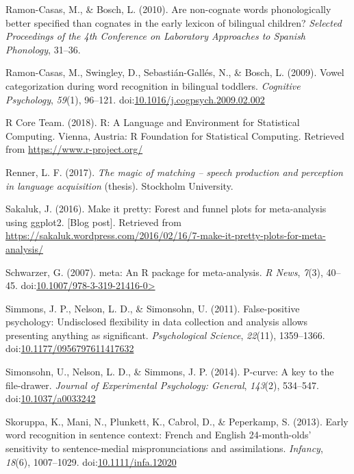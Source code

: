 \documentclass[
  man, noextraspace]{apa6}
\begin{document}
\leavevmode\hypertarget{ref-Ramon-Casas2010}{}%
Ramon-Casas, M., \& Bosch, L. (2010). Are non-cognate words phonologically better specified than cognates in the early lexicon of bilingual children? \emph{Selected Proceedings of the 4th Conference on Laboratory Approaches to Spanish Phonology}, 31--36.

\leavevmode\hypertarget{ref-Ramon-Casas2009}{}%
Ramon-Casas, M., Swingley, D., Sebastián-Gallés, N., \& Bosch, L. (2009). Vowel categorization during word recognition in bilingual toddlers. \emph{Cognitive Psychology}, \emph{59}(1), 96--121. doi:\href{https://doi.org/10.1016/j.cogpsych.2009.02.002}{10.1016/j.cogpsych.2009.02.002}

\leavevmode\hypertarget{ref-R}{}%
R Core Team. (2018). R: A Language and Environment for Statistical Computing. Vienna, Austria: R Foundation for Statistical Computing. Retrieved from \url{https://www.r-project.org/}

\leavevmode\hypertarget{ref-Renner2017}{}%
Renner, L. F. (2017). \emph{The magic of matching -- speech production and perception in language acquisition} (thesis). Stockholm University.

\leavevmode\hypertarget{ref-Sakaluk2016}{}%
Sakaluk, J. (2016). Make it pretty: Forest and funnel plots for meta-analysis using ggplot2. {[}Blog post{]}. Retrieved from \url{https://sakaluk.wordpress.com/2016/02/16/7-make-it-pretty-plots-for-meta-analysis/}

\leavevmode\hypertarget{ref-meta}{}%
Schwarzer, G. (2007). meta: An R package for meta-analysis. \emph{R News}, \emph{7}(3), 40--45. doi:\href{https://doi.org/10.1007/978-3-319-21416-0\%3E}{10.1007/978-3-319-21416-0\textgreater{}}

\leavevmode\hypertarget{ref-Simmons2011}{}%
Simmons, J. P., Nelson, L. D., \& Simonsohn, U. (2011). False-positive psychology: Undisclosed flexibility in data collection and analysis allows presenting anything as significant. \emph{Psychological Science}, \emph{22}(11), 1359--1366. doi:\href{https://doi.org/10.1177/0956797611417632}{10.1177/0956797611417632}

\leavevmode\hypertarget{ref-pcurve}{}%
Simonsohn, U., Nelson, L. D., \& Simmons, J. P. (2014). P-curve: A key to the file-drawer. \emph{Journal of Experimental Psychology: General}, \emph{143}(2), 534--547. doi:\href{https://doi.org/10.1037/a0033242}{10.1037/a0033242}

\leavevmode\hypertarget{ref-Skoruppa2013}{}%
Skoruppa, K., Mani, N., Plunkett, K., Cabrol, D., \& Peperkamp, S. (2013). Early word recognition in sentence context: French and English 24-month-olds' sensitivity to sentence-medial mispronunciations and assimilations. \emph{Infancy}, \emph{18}(6), 1007--1029. doi:\href{https://doi.org/10.1111/infa.12020}{10.1111/infa.12020}
\end{document}
